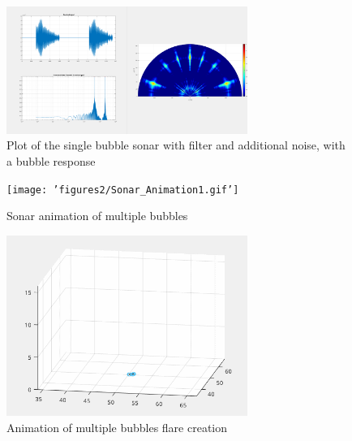 \documentclass[11pt]{article}
\begin{document}
\begin{figure} [H]
    \centering
    \includegraphics[width=0.7\textwidth]{figures/sonar-addnoise-bubble.png}
    \caption{Plot of the single bubble sonar with filter and additional noise, with a bubble response}
    \label{fig:single-bubble_sonar-addnoise-bubble}
\end{figure}

\begin{figure} [H]
    \centering
    \texttt{[image: 'figures2/Sonar\_Animation1.gif']}
    \caption{Sonar animation of multiple bubbles}
    \label{fig:Sonar_Animation1}
\end{figure}
\begin{figure} [H]
    \centering
    \includegraphics[width=0.7\textwidth]{figures2/Bubble_mov3.gif}
    \caption{Animation of multiple bubbles flare creation}
    \label{fig:Bubble_mov3}
\end{figure}

%
%
\end{document}
